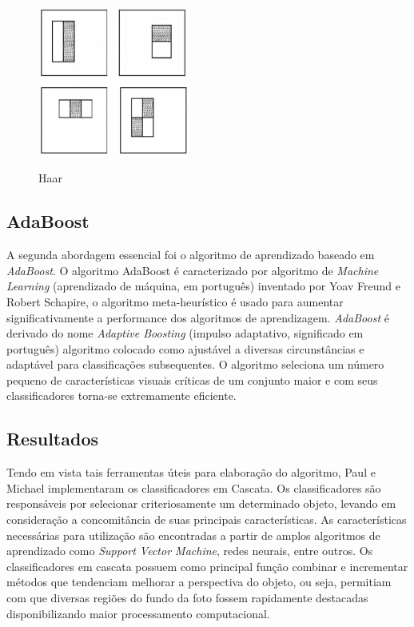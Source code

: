 \documentclass[12pt,a4paper]{article}
\begin{document}
\begin{figure}[h!]
\centering
\includegraphics[width=5cm]{recursos/imagens/Haar.png}
\label{4}
\caption{Haar}
\end{figure} 



























\subsection{AdaBoost}

A segunda abordagem essencial foi o algoritmo de aprendizado baseado em \textit{AdaBoost}. O algoritmo AdaBoost é caracterizado por algoritmo de\textit{ Machine Learning} (aprendizado de máquina, em português) inventado por Yoav Freund e Robert Schapire, o algoritmo meta-heurístico é usado para aumentar significativamente a performance dos algoritmos de aprendizagem. \textit{AdaBoost} é derivado do nome \textit{Adaptive Boosting} (impulso adaptativo, significado em português) algoritmo colocado como ajustável a diversas circunstâncias e adaptável para classificações subsequentes. O algoritmo seleciona um número pequeno de características visuais críticas de um conjunto maior e com seus classificadores torna-se extremamente eficiente. 

\subsection{Resultados}


Tendo em vista tais ferramentas úteis para elaboração do algoritmo, Paul e Michael implementaram os classificadores em Cascata. Os classificadores são responsáveis por selecionar criteriosamente um determinado objeto, levando em consideração a concomitância de suas principais características. As características necessárias para utilização são encontradas a partir de amplos algoritmos de aprendizado como \textit{Support Vector Machine}, redes neurais, entre outros. Os classificadores em cascata possuem como principal função combinar e incrementar métodos que tendenciam melhorar a perspectiva do objeto, ou seja, permitiam com que diversas regiões do fundo da foto fossem rapidamente destacadas disponibilizando maior processamento computacional.
\end{document}
